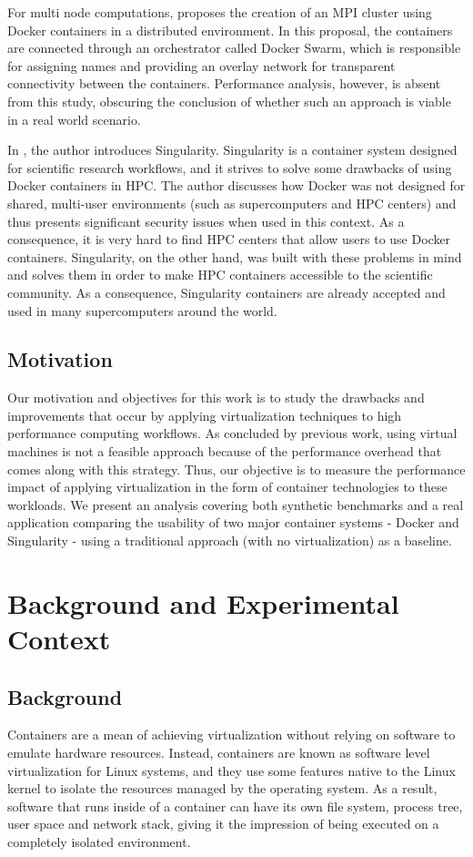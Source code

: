 \documentclass[12pt]{article}
\begin{document}
For multi node computations, \cite{7868429} proposes the creation of an MPI cluster using Docker containers in a distributed environment. In this proposal, the containers are connected through an orchestrator called Docker Swarm, which is responsible for assigning names and providing an overlay network  for transparent connectivity between the containers. Performance analysis, however, is absent from this study, obscuring the conclusion of whether such an approach is viable in a real world scenario.

In \cite{10.1371/journal.pone.0177459}, the author introduces Singularity. Singularity is a container system designed for scientific research workflows, and it strives to solve some drawbacks of using Docker containers in HPC. The author discusses how Docker was not designed for shared, multi-user environments (such as supercomputers and HPC centers) and thus presents significant security issues when used in this context. As a consequence, it is very hard to find HPC centers that allow users to use Docker containers. Singularity, on the other hand, was built with these problems in mind and solves them in order to make HPC containers accessible to the scientific community. As a consequence, Singularity containers are already accepted and used in many supercomputers around the world.

\subsection{Motivation}
Our motivation and objectives for this work is to study the drawbacks and improvements that occur by applying virtualization techniques to high performance computing workflows. As concluded by previous work, using virtual machines is not a feasible approach because of the performance overhead that comes along with this strategy. Thus, our objective is to measure the performance impact of applying virtualization in the form of container technologies to these workloads. We present an analysis covering both synthetic benchmarks and a real application comparing the usability of two major container systems - Docker and Singularity - using a traditional approach (with no virtualization) as a baseline. 

\section{Background and Experimental Context}
\subsection{Background}
Containers are a mean of achieving virtualization without relying on software to emulate hardware resources. Instead, containers are known as software level virtualization for Linux systems, and they use some features native to the Linux kernel to isolate the resources managed by the operating system. As a result, software that runs inside of a container can have its own file system, process tree, user space and network stack, giving it the impression of being executed on a completely isolated environment.
\end{document}
